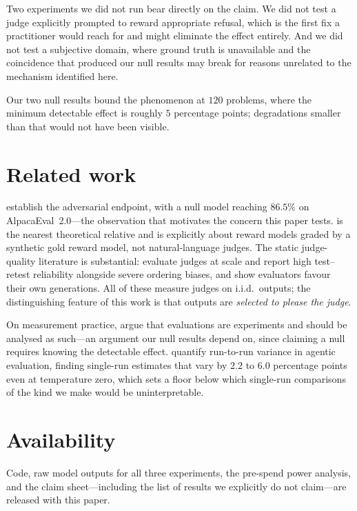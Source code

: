 \documentclass[10pt,twocolumn]{article}
\begin{document}
Two experiments we did not run bear directly on the claim. We did not test a judge explicitly prompted to reward appropriate refusal, which is the first fix a practitioner would reach for and might eliminate the effect entirely. And we did not test a subjective domain, where ground truth is unavailable and the coincidence that produced our null results may break for reasons unrelated to the mechanism identified here.

Our two null results bound the phenomenon at $120$ problems, where the minimum detectable effect is roughly $5$ percentage points; degradations smaller than that would not have been visible.

\section{Related work}

\citet{zheng2024cheating} establish the adversarial endpoint, with a null model reaching $86.5\%$ on AlpacaEval~2.0---the observation that motivates the concern this paper tests. \citet{gao2022scaling} is the nearest theoretical relative and is explicitly about reward models graded by a synthetic gold reward model, not natural-language judges. The static judge-quality literature is substantial: \citet{norman2026reliability} evaluate judges at scale and report high test--retest reliability alongside severe ordering biases, and \citet{panickssery2024llm} show evaluators favour their own generations. All of these measure judges on i.i.d.\ outputs; the distinguishing feature of this work is that outputs are \emph{selected to please the judge}.

On measurement practice, \citet{miller2024adding} argue that evaluations are experiments and should be analysed as such---an argument our null results depend on, since claiming a null requires knowing the detectable effect. \citet{bjarnason2026randomness} quantify run-to-run variance in agentic evaluation, finding single-run estimates that vary by $2.2$ to $6.0$ percentage points even at temperature zero, which sets a floor below which single-run comparisons of the kind we make would be uninterpretable.

\section{Availability}

Code, raw model outputs for all three experiments, the pre-spend power analysis, and the claim sheet---including the list of results we explicitly do not claim---are released with this paper.


\end{document}
